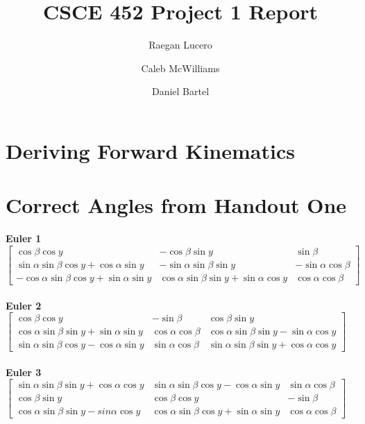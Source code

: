 \documentclass{article}
\title{CSCE 452 Project 1 Report}
\author{Raegan Lucero
\and
 Caleb McWilliams
\and
 Daniel Bartel}
\date{}
\begin{document}
\maketitle

\section*{Deriving Forward Kinematics}



\section*{Correct Angles from Handout One}
\textbf{Euler 1}
$
\begin{bmatrix}
\cos\beta\cos y & -\cos\beta\sin y & \sin\beta \\

\sin\alpha\sin\beta\cos y + \cos\alpha\sin y & -\sin\alpha\sin\beta\sin y & -\sin\alpha\cos\beta \\

-\cos\alpha\sin\beta\cos y + \sin\alpha\sin y & \cos\alpha\sin\beta\sin y + \sin\alpha\cos y & \cos\alpha\cos\beta
\end{bmatrix}
$
\\ \ \\
\textbf{Euler 2}
$
\begin{bmatrix}
\cos\beta\cos y & -\sin\beta & \cos\beta\sin y \\

\cos\alpha\sin\beta\sin y + \sin\alpha\sin y & \cos\alpha\cos\beta & \cos\alpha\sin\beta\sin y - \sin\alpha\cos y \\

\sin\alpha\sin\beta\cos y - \cos\alpha\sin y & \sin\alpha\cos\beta & \sin\alpha\sin\beta\sin y + \cos\alpha\cos y
\end{bmatrix}
$
\\ \ \\
\textbf{Euler 3}
$
\begin{bmatrix}
\sin\alpha\sin\beta\sin y + \cos\alpha\cos y & \sin\alpha\sin\beta\cos y - \cos\alpha\sin y & \sin\alpha\cos\beta \\

\cos\beta\sin y & \cos\beta\cos y & -\sin\beta \\
\cos\alpha\sin\beta\sin y - sin\alpha\cos y & \cos\alpha\sin\beta\cos y + \sin\alpha\sin y & \cos\alpha\cos\beta
\end{bmatrix}
$
\\ \ \\
\end{document}

